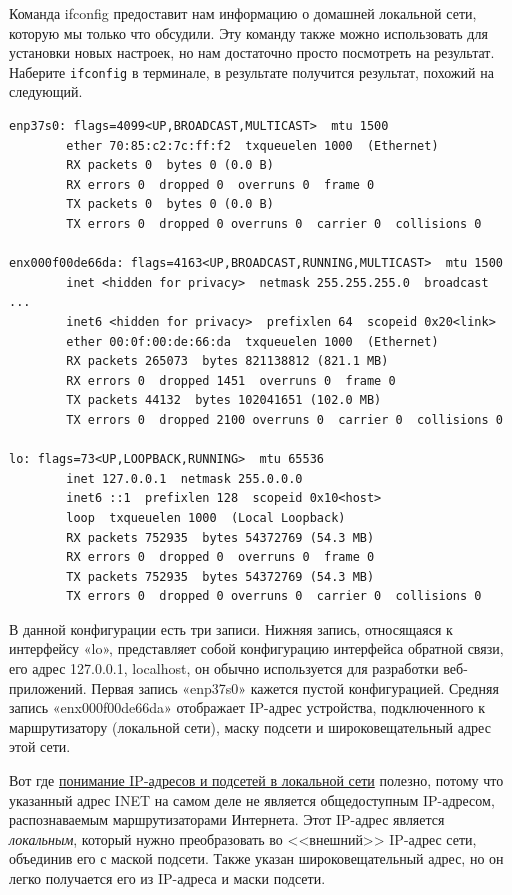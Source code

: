 \documentclass[12pt]{article}
\begin{document}
Команда ifconfig предоставит нам информацию о домашней локальной сети,
которую мы только что обсудили. Эту команду также можно использовать для
установки новых настроек, но нам достаточно просто посмотреть на
результат. Наберите \texttt{ifconfig} в терминале, в результате
получится результат, похожий на следующий.

\begin{verbatim}
enp37s0: flags=4099<UP,BROADCAST,MULTICAST>  mtu 1500
        ether 70:85:c2:7c:ff:f2  txqueuelen 1000  (Ethernet)
        RX packets 0  bytes 0 (0.0 B)
        RX errors 0  dropped 0  overruns 0  frame 0
        TX packets 0  bytes 0 (0.0 B)
        TX errors 0  dropped 0 overruns 0  carrier 0  collisions 0

enx000f00de66da: flags=4163<UP,BROADCAST,RUNNING,MULTICAST>  mtu 1500
        inet <hidden for privacy>  netmask 255.255.255.0  broadcast ...
        inet6 <hidden for privacy>  prefixlen 64  scopeid 0x20<link>
        ether 00:0f:00:de:66:da  txqueuelen 1000  (Ethernet)
        RX packets 265073  bytes 821138812 (821.1 MB)
        RX errors 0  dropped 1451  overruns 0  frame 0
        TX packets 44132  bytes 102041651 (102.0 MB)
        TX errors 0  dropped 2100 overruns 0  carrier 0  collisions 0

lo: flags=73<UP,LOOPBACK,RUNNING>  mtu 65536
        inet 127.0.0.1  netmask 255.0.0.0
        inet6 ::1  prefixlen 128  scopeid 0x10<host>
        loop  txqueuelen 1000  (Local Loopback)
        RX packets 752935  bytes 54372769 (54.3 MB)
        RX errors 0  dropped 0  overruns 0  frame 0
        TX packets 752935  bytes 54372769 (54.3 MB)
        TX errors 0  dropped 0 overruns 0  carrier 0  collisions 0
\end{verbatim}

В данной конфигурации есть три записи. Нижняя запись, относящаяся к
интерфейсу «lo», представляет собой конфигурацию интерфейса обратной
связи, его адрес 127.0.0.1, localhost, он обычно используется для
разработки веб-приложений. Первая запись «enp37s0» кажется пустой
конфигурацией. Средняя запись «enx000f00de66da» отображает IP-адрес
устройства, подключенного к маршрутизатору (локальной сети), маску
подсети и широковещательный адрес этой сети.

Вот где \href{blog/2019/ip-addresses-netmasks}{понимание IP-адресов и
подсетей в локальной сети} полезно, потому что указанный адрес INET на
самом деле не является общедоступным IP-адресом, распознаваемым
маршрутизаторами Интернета. Этот IP-адрес является \emph{локальным},
который нужно преобразовать во <<внешний>> IP-адрес сети, объединив его с
маской подсети. Также указан широковещательный адрес, но он легко
получается его из IP-адреса и маски подсети.
\end{document}
